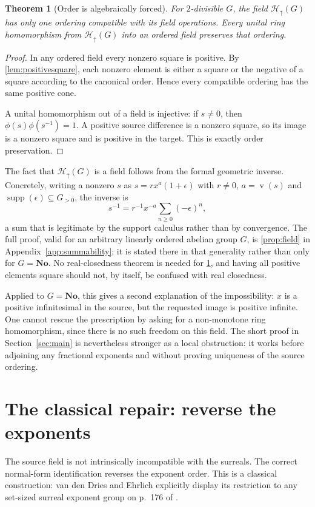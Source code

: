\documentclass[11pt,letterpaper]{article}
\newtheorem{theorem}{Theorem}[section]
\theoremstyle{definition}
\theoremstyle{remark}
\newcommand{\No}{\mathbf{No}}
\newcommand{\Hu}[1]{\mathcal H_{\uparrow}(#1)}
\newcommand{\supp}{\operatorname{supp}}
\newcommand{\vexp}{\operatorname{v}}
\begin{document}
\begin{theorem}[Order is algebraically forced]\label{thm:orderforced}
For $2$-divisible $G$, the field $\Hu{G}$ has only one ordering compatible
with its field operations. Every unital ring homomorphism from $\Hu{G}$
into an ordered field preserves that ordering.
\end{theorem}
\begin{proof}
In any ordered field every nonzero square is positive. By
\cref{lem:positivesquare}, each nonzero element is either a square or the
negative of a square according to the canonical order. Hence every compatible
ordering has the same positive cone.

A unital homomorphism out of a field is injective: if $s\ne0$, then
$\phi(s)\phi(s^{-1})=1$. A positive source difference is a nonzero square,
so its image is a nonzero square and is positive in the target. This is
exactly order preservation.
\end{proof}

The fact that $\Hu{G}$ is a field follows from the formal geometric inverse.
Concretely, writing a nonzero $s$ as $s=rx^a(1+\epsilon)$ with $r\ne0$,
$a=\vexp(s)$ and $\supp(\epsilon)\subseteq G_{>0}$, the inverse is
\[
 s^{-1}=r^{-1}x^{-a}\sum_{n\ge0}(-\epsilon)^n,
\]
a sum that is legitimate by the support calculus rather than by convergence.
The full proof, valid for an arbitrary linearly ordered abelian group $G$, is
\cref{prop:field} in Appendix~\ref{app:summability}; it is stated there in that
generality rather than only for $G=\No$. No real-closedness
theorem is needed for \cref{thm:orderforced}, and having all positive elements
square should not, by itself, be confused with real closedness.

Applied to $G=\No$, this gives a second explanation of the impossibility:
$x$ is a positive infinitesimal in the source, but the requested image is
positive infinite. One cannot rescue the prescription by asking for a
non-monotone ring homomorphism, since there is no such freedom on this field.
The short proof in Section~\ref{sec:main} is nevertheless stronger as a local
obstruction: it works before adjoining any fractional exponents and without
proving uniqueness of the source ordering.

\section{The classical repair: reverse the exponents}\label{sec:repair}
The source field is not intrinsically incompatible with the surreals. The
correct normal-form identification reverses the exponent order. This is a
classical construction: van den Dries and Ehrlich explicitly display its
restriction to any set-sized surreal exponent group on p.~176 of
\citet{DriesEhrlich2001}.
\end{document}
